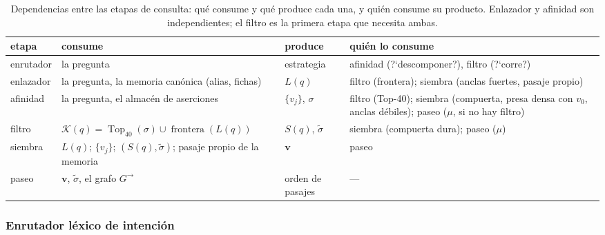\documentclass[11pt,a4paper]{article}
\newcommand{\op}[1]{\operatorname{#1}}
\begin{document}
\begin{table}[t]
\centering\footnotesize\setlength{\tabcolsep}{3.5pt}
\caption{Dependencias entre las etapas de consulta: qué consume y qué
produce cada una, y quién consume su producto. Enlazador y afinidad son
independientes; el filtro es la primera etapa que necesita ambas.}
\label{tab:dependencias}
\begin{tabular}{lp{}p{}p{}}
\toprule
etapa & consume & produce & quién lo consume\\
\midrule
enrutador & la pregunta & estrategia & afinidad (?`descomponer?), filtro (?`corre?)\\
enlazador & la pregunta, la memoria canónica (alias, fichas) & $L(q)$ & filtro (frontera); siembra (anclas fuertes, pasaje propio)\\
afinidad & la pregunta, el almacén de aserciones & $\{v_j\}$, $\sigma$ & filtro (Top-40); siembra (compuerta, presa densa con $v_0$, anclas débiles); paseo ($\mu$, si no hay filtro)\\
filtro & $\mathcal{K}(q)=\op{Top}_{40}(\sigma)\cup\op{frontera}(L(q))$ & $S(q)$, $\tilde\sigma$ & siembra (compuerta dura); paseo ($\mu$)\\
siembra & $L(q)$; $\{v_j\}$; $(S(q),\tilde\sigma)$; pasaje propio de la memoria & $\mathbf{v}$ & paseo\\
paseo & $\mathbf{v}$, $\tilde\sigma$, el grafo $G^{\!\rightarrow}$ & orden de pasajes & ---\\
\bottomrule
\end{tabular}
\end{table}

\subsubsection{Enrutador léxico de intención}
\label{sec:router}
\end{document}
